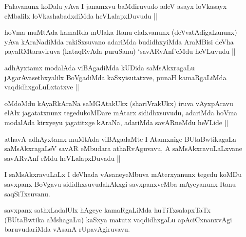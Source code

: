 
\begin{artha}
Palavanunx koDalu yAva I janamxvu baMdiruvudo adeV asayx loVkasayx eMbalilx loVkashabadxdiMda heVLalapxDuvudu ||
\end{artha}


\begin{artha}
hoVma muMtAda kamaRda mUlaka Itanu elalxvanunx (deVvatAdigaLanunx) yAva kAraNadiMda rakiSxsuvano adariMda budidhxyiMda AraMBisi deVha payaRMtaraviruva (kataqRvAda puruSanu) `savARvAnf'eMdu heVLuvudu ||
\end{artha}

\begin{artha}
adhAyxtamx modalAda viBAgadiMda kUDida saMsAkxragaLu jAgarAvasethxyalilx BoVgadiMda kaSxyisutatxve, punaH kamaRgaLiMda vaqdidhxgoLuLxtatxve ||
\end{artha}


\begin{artha}
oMdoMdu kAyaRkAraNa saMGAtakUkx (shariVrakUkx) iruva vAyxpAravu elAlx jagatatxnunx tegedukoMDare mAtarx sididhxsuvudu, adariMda hoVma modalAda kirxyeyu jagatitxge kAraNa, adariMda savARneMdu heVLide ||
\end{artha}


\begin{artha}
athavA adhAyxtamx muMtAda viBAgadaMte I Atamxnige BUtaBwtikagaLa saMsAkxragaLeV savAR eMbudara athaRvAguvavu, A saMsAkxravuLaLxvane savARvAnf eMdu heVLalapxDuvadu ||
\end{artha}

\begin{artha}
I saMsAkxravuLaLx I deVhada vAsaneyeMbuva mAterxyanunx tegedu koMDu savxpanx BoVgavu sididhxsuvudakAkxgi savxpanxveMba mAyeyanunx Itanu saqSiTxsuvanu.
\end{artha}

\begin{artha}
savxpanx sathxLadalUlx hAgeye kamaRgaLiMda huTiTxsalapxTaTx (BUtaBwtika aMshagaLu) kaSxya matutx vaqdidhxgaLu apAciCxnanxvAgi baruvudariMda vAsanA rUpavAgiruvavu.
\end{artha}

